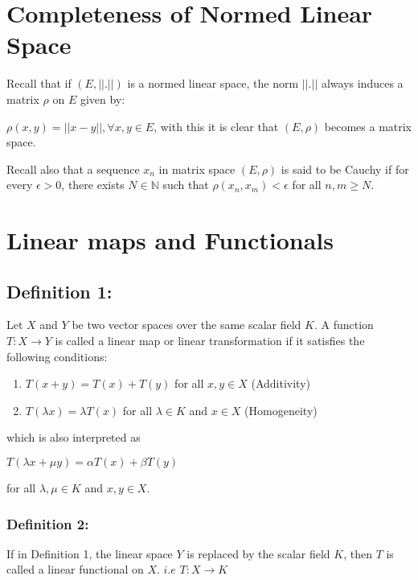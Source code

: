 \documentclass[12pt]{article}
\begin{document}
\section{Completeness of Normed Linear Space}
Recall that if $(E, ||.||)$ is a normed linear space, the norm $||.||$ always induces a matrix $\rho$ on $E$ given by:

\(\rho(x,y) = ||x-y||, \forall x,y \in E\), with this it is clear that $(E,\rho)$ becomes a matrix space.

Recall also that a sequence ${x_n}$ in matrix space $(E,\rho)$ is said to be Cauchy if for every $\epsilon > 0$, there exists $N \in \mathbb{N}$ such that $\rho(x_n,x_m) < \epsilon$ for all $n,m \geq N$.



\section{Linear maps and Functionals}
\subsection*{Definition 1:}
Let $X$ and $Y$ be two vector spaces over the same scalar field $K$. A function $T: X \to Y$ is called a linear map or linear transformation if it satisfies the following conditions:

\begin{enumerate}
    \item $T(x + y) = T(x) + T(y)$ for all $x, y \in X$ (Additivity)
    \item $T(\lambda x) = \lambda T(x)$ for all $\lambda \in K$ and $x \in X$ (Homogeneity)
\end{enumerate}

which is also interpreted as

\begin{math}
    T(\lambda x + \mu y) = \alpha T(x) + \beta T(y)
\end{math}

for all $\lambda, \mu \in K$ and $x, y \in X$.

\subsubsection*{Definition 2:}
If in Definition 1, the linear space $Y$ is replaced by the scalar field $K$, then $T$ is called a linear functional on $X$.
$i.e$
\begin{math}
    T: X \to K
\end{math}
\end{document}
